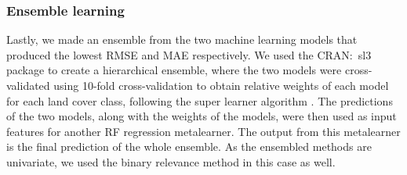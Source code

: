 \documentclass[review,authoryear,3p]{elsarticle}
\newcommand{\cran}[1]{CRAN:~#1}
\begin{document}
\subsubsection{Ensemble learning}

Lastly, we made an ensemble from the two machine learning models that produced the lowest \gls{RMSE} and \gls{MAE} respectively.
We used the \cran{sl3} package \citep{sl3} to create a hierarchical ensemble, where the two models were cross-validated using 10-fold cross-validation to obtain relative weights of each model for each land cover class, following the super learner algorithm \citep{laan_super_2007}.
The predictions of the two models, along with the weights of the models, were then used as input features for another \gls{RF} regression metalearner.
The output from this metalearner is the final prediction of the whole ensemble.
As the ensembled methods are univariate, we used the binary relevance method in this case as well.




\end{document}
